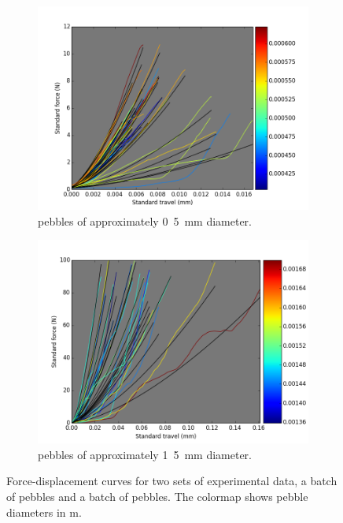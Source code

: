 \begin{figure}
        \centering
        \begin{subfigure}[b]{0.75\textwidth}
                \includegraphics[width=\textwidth]{chapters/figures/fzk-hertz-colormap}
                \caption{\lis pebbles of approximately \si{0.5 mm} diameter.}
                \label{fig:fzk-hertz-colormap}
        \end{subfigure}
         
        \begin{subfigure}[b]{0.75\textwidth}
                \includegraphics[width=\textwidth]{chapters/figures/nfri-hertz-colormap}
                \caption{\lit pebbles of approximately \si{1.5 mm} diameter.}
                \label{fig:nfri-hertz-colormap}
        \end{subfigure}
        \caption{Force-displacement curves for two sets of experimental data, a batch of \lis pebbles and a batch of \lit pebbles. The colormap shows pebble diameters in \si{m}.}\label{fig:exp-hertz}
\end{figure}



